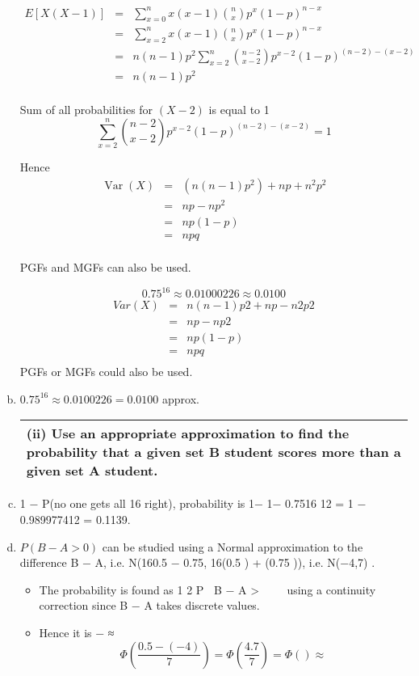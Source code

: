 \documentclass[a4paper,12pt]{article}
\begin{document}
\begin{enumerate}[(a)]
\begin{eqnarray*}
E[X(X-1)] 
&=& \sum^{n}_{x=0} x(x-1) {n \choose x} p^x (1-p)^{n-x} \\
&=& \sum^{n}_{x=2} x(x-1) {n \choose x} p^x (1-p)^{n-x} \\
&=& n(n-1)p^2 \sum^{n}_{x=2} {n-2 \choose x-2} p^{x-2} (1-p)^{(n-2)-(x-2)} \\
&=& n(n-1)p^2 \\
\end{eqnarray*}


\begin{framed}
Sum of all probabilities for $(X-2)$ is equal to 1
\[ \sum^{n}_{x=2} {n-2 \choose x-2} p^{x-2} (1-p)^{(n-2)-(x-2)} = 1\]
\end{framed}


Hence 
\begin{eqnarray*}
\operatorname{Var}(X) &=& (n(n-1)p^2) + np + n^2p^2\\
&=& np - np^2 \\
&=&np(1-p)\\
&=&npq\\
\end{eqnarray*}


PGFs and MGFs can also be used.


\[0.75^{16} \approx 0.01000226 \approx 0.0100\]
\begin{eqnarray*}
Var (X) &=& n(n −1) p2 + np − n2 p2 \\
&=& np − np2\\ 
&=& np(1-p) \\
&=& npq \\
\end{eqnarray*}
PGFs or MGFs could also be used.
\item  $0.75^{16} \approx 0.0100226 = 0.0100$ approx.
\newpage
\begin{table}[ht!]
\centering
\begin{tabular}{|p{15cm}|}
\hline
\noindent (ii) Use an appropriate approximation to find the probability that a given set B
student scores more than a given set A student.



\\ \hline
\end{tabular}
\end{table}


\item 1 − P(no one gets all 16 right), probability is { }1− 1− 0.7516 12
= 1 − {0.9899774}12 = 0.1139.
\item $P(B − A > 0)$ can be studied using a Normal approximation to the difference
B − A, i.e. N(16{0.5 − 0.75}, 16{(0.5 ) + (0.75 )}), i.e. N(−4,7) .
\begin{itemize}
\item The probability is found as 1
2
P B − A > 
 
using a continuity correction since B − A
takes discrete values.
\item Hence it is  − ≈
   
\[  \Phi\left( \frac{0.5 -(-4)}{7}\right) = \Phi\left( \frac{4.7}{7}\right) = \Phi() \approx \]


\end{itemize}
\end{enumerate}
\end{document}
